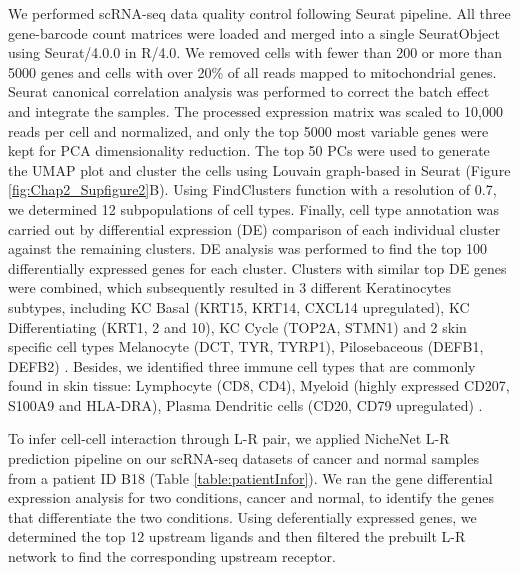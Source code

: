 We performed scRNA-seq data quality control following Seurat pipeline. All three gene-barcode count matrices were loaded and merged into a single SeuratObject using Seurat/4.0.0 in R/4.0. We removed cells with fewer than 200 or more than 5000 genes and cells with over 20\% of all reads mapped to mitochondrial genes. Seurat canonical correlation analysis was performed to correct the batch effect and integrate the samples. The processed expression matrix was scaled to 10,000 reads per cell and normalized, and only the top 5000 most variable genes were kept for PCA dimensionality reduction. The top 50 PCs were used to generate the UMAP plot and cluster the cells using Louvain graph-based in Seurat (Figure \ref{fig:Chap2_Supfigure2}B). Using FindClusters function with a resolution of 0.7, we determined 12 subpopulations of cell types. Finally, cell type annotation was carried out by differential expression (DE) comparison of each individual cluster against the remaining clusters. DE analysis was performed to find the top 100 differentially expressed genes for each cluster. Clusters with similar top DE genes were combined, which subsequently resulted in 3 different Keratinocytes subtypes, including KC Basal (KRT15, KRT14, CXCL14  upregulated), KC Differentiating (KRT1, 2 and 10), KC Cycle (TOP2A, STMN1)  \cite{joost2016single, ji2020multimodal} and 2 skin specific cell types Melanocyte (DCT, TYR, TYRP1), Pilosebaceous (DEFB1, DEFB2) \cite{belote2021human}. Besides, we identified three immune cell types that are commonly found in skin tissue: Lymphocyte (CD8, CD4), Myeloid (highly expressed CD207, S100A9 and HLA-DRA), Plasma Dendritic cells (CD20, CD79 upregulated) \cite{ji2020multimodal}.          

To infer cell-cell interaction through L-R pair, we applied NicheNet L-R prediction pipeline \cite{browaeys2020nichenet} on our scRNA-seq datasets of cancer and normal samples from a patient ID B18 (Table \ref{table:patientInfor}). We ran the gene differential expression analysis for two conditions, cancer and normal, to identify the genes that differentiate the two conditions. Using deferentially expressed genes, we determined the top 12 upstream ligands and then filtered the prebuilt L-R network to find the corresponding upstream receptor.

